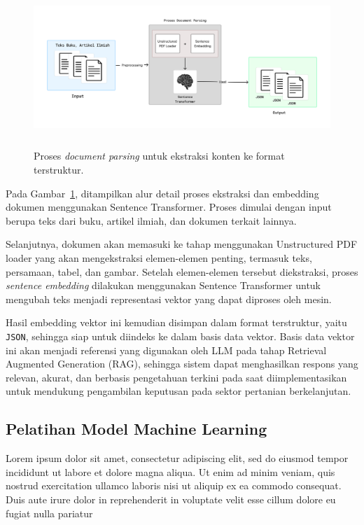\documentclass{article} %
\begin{document}
\begin{figure}[H]
    \centering
    \includegraphics[height=6cm]{flow-diagram.drawio.png}
    \caption{Proses \textit{document parsing} untuk ekstraksi konten ke format terstruktur.}
    \label{fig:flow_parsed}
\end{figure}

Pada Gambar~\ref{fig:flow_parsed}, ditampilkan alur detail proses ekstraksi dan embedding dokumen menggunakan Sentence Transformer. Proses dimulai dengan input berupa teks dari buku, artikel ilmiah, dan dokumen terkait lainnya. 

Selanjutnya, dokumen akan memasuki ke tahap menggunakan Unstructured PDF loader yang akan mengekstraksi elemen-elemen penting, termasuk teks, persamaan, tabel, dan gambar. Setelah elemen-elemen tersebut diekstraksi, proses \textit{sentence embedding} dilakukan menggunakan Sentence Transformer untuk mengubah teks menjadi representasi vektor yang dapat diproses oleh mesin.

Hasil embedding vektor ini kemudian disimpan dalam format terstruktur, yaitu \texttt{JSON}, sehingga siap untuk diindeks ke dalam basis data vektor. Basis data vektor ini akan menjadi referensi yang digunakan oleh LLM pada tahap Retrieval Augmented Generation (RAG), sehingga sistem dapat menghasilkan respons yang relevan, akurat, dan berbasis pengetahuan terkini pada saat diimplementasikan untuk mendukung pengambilan keputusan pada sektor pertanian berkelanjutan.



\subsection{Pelatihan Model Machine Learning}
Lorem ipsum dolor sit amet, consectetur adipiscing elit, sed do eiusmod tempor incididunt ut labore et dolore magna aliqua. Ut enim ad minim veniam, quis nostrud exercitation ullamco laboris nisi ut aliquip ex ea commodo consequat. Duis aute irure dolor in reprehenderit in voluptate velit esse cillum dolore eu fugiat nulla pariatur
\end{document}
